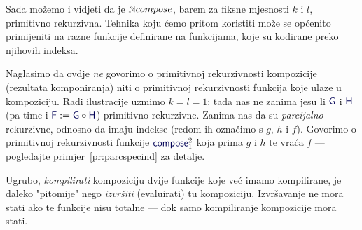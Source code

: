 
Sada možemo i vidjeti da je ${\mathbb N} compose$, barem za fiksne mjesnosti $k$ i $l$, primitivno rekurzivna. Tehnika koju ćemo pritom koristiti može se općenito primijeniti na razne funkcije definirane na funkcijama, koje su kodirane preko njihovih indeksa.

Naglasimo da ovdje \emph{ne} govorimo o primitivnoj rekurzivnosti kompozicije (rezultata komponiranja) niti o primitivnoj rekurzivnosti funkcija koje ulaze u kompoziciju. Radi ilustracije uzmimo $k=l=1$: tada nas ne zanima jesu li $\f G$ i $\f H$ (pa time i $\f F:=\f G\circ\f H$) primitivno rekurzivne. Zanima nas da su \emph{parcijalno} rekurzivne, odnosno da imaju indekse (redom ih označimo s $g$, $h$ i $f$). Govorimo o primitivnoj rekurzivnosti funkcije $\f{compose}_1^2$ koja prima $g$ i $h$ te vraća $f$ --- pogledajte primjer~\ref{pr:parcspecind} za detalje.

Ugrubo, \emph{kompilirati} kompoziciju dvije funkcije koje već imamo kompilirane, je daleko "pitomije" nego \emph{izvršiti} (evaluirati) tu kompoziciju. Izvršavanje ne mora stati ako te funkcije nisu totalne --- dok s\=amo kompiliranje kompozicije mora stati.

